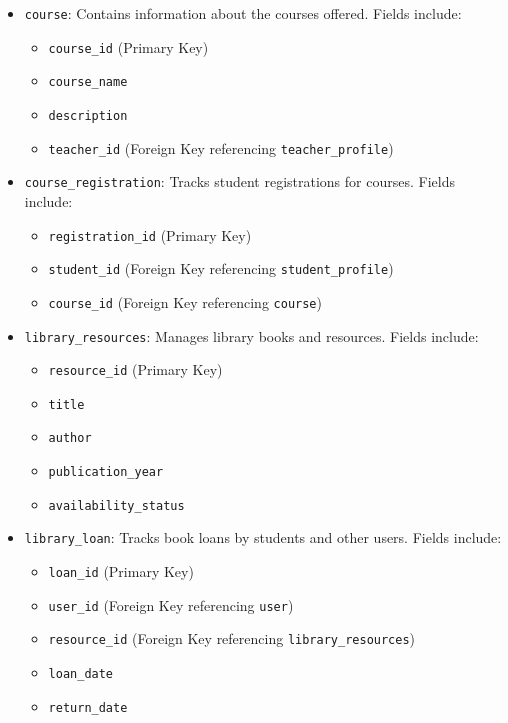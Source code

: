 \documentclass[12pt]{article}
\begin{document}
\begin{itemize}
    \clearpage  %

    \item \texttt{course}: Contains information about the courses offered. Fields include:
    \begin{itemize}
        \item \texttt{course\_id} (Primary Key)
        \item \texttt{course\_name}
        \item \texttt{description}
        \item \texttt{teacher\_id} (Foreign Key referencing \texttt{teacher\_profile})
    \end{itemize}
    
    \item \texttt{course\_registration}: Tracks student registrations for courses. Fields include:
    \begin{itemize}
        \item \texttt{registration\_id} (Primary Key)
        \item \texttt{student\_id} (Foreign Key referencing \texttt{student\_profile})
        \item \texttt{course\_id} (Foreign Key referencing \texttt{course})
    \end{itemize}
    
    \item \texttt{library\_resources}: Manages library books and resources. Fields include:
    \begin{itemize}
        \item \texttt{resource\_id} (Primary Key)
        \item \texttt{title}
        \item \texttt{author}
        \item \texttt{publication\_year}
        \item \texttt{availability\_status}
    \end{itemize}
    
    \item \texttt{library\_loan}: Tracks book loans by students and other users. Fields include:
    \begin{itemize}
        \item \texttt{loan\_id} (Primary Key)
        \item \texttt{user\_id} (Foreign Key referencing \texttt{user})
        \item \texttt{resource\_id} (Foreign Key referencing \texttt{library\_resources})
        \item \texttt{loan\_date}
        \item \texttt{return\_date}
    \end{itemize}
    

\end{itemize}
\end{document}
